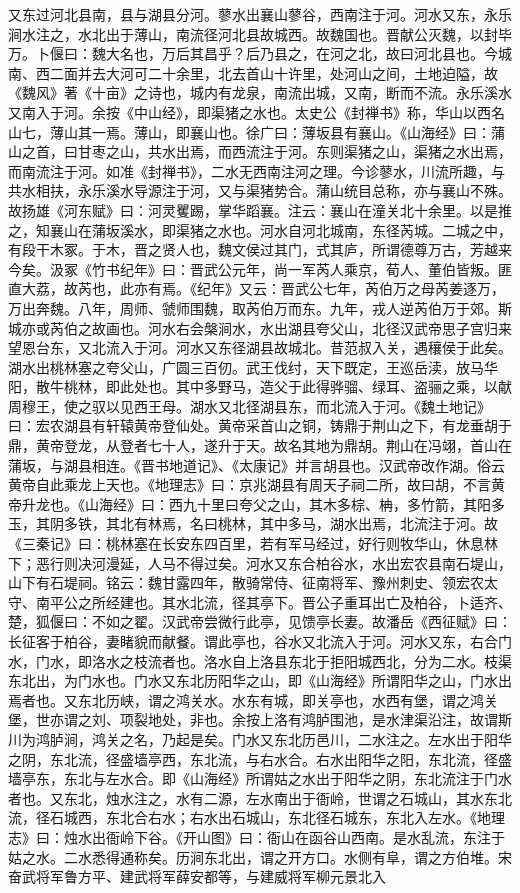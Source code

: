 \documentclass[12pt,UTF8]{ctexbook}
\begin{document}
又东过河北县南，县与湖县分河。蓼水出襄山蓼谷，西南注于河。河水又东，永乐涧水注之，水北出于薄山，南流径河北县故城西。故魏国也。晋献公灭魏，以封毕万。卜偃曰：魏大名也，万后其昌乎？后乃县之，在河之北，故曰河北县也。今城南、西二面并去大河可二十余里，北去首山十许里，处河山之间，土地迫隘，故《魏风》著《十亩》之诗也，城内有龙泉，南流出城，又南，断而不流。永乐溪水又南入于河。余按《中山经》，即渠猪之水也。太史公《封禅书》称，华山以西名山七，薄山其一焉。薄山，即襄山也。徐广曰：薄坂县有襄山。《山海经》曰：蒲山之首，曰甘枣之山，共水出焉，而西流注于河。东则渠猪之山，渠猪之水出焉，而南流注于河。如准《封禅书》，二水无西南注河之理。今诊蓼水，川流所趣，与共水相扶，永乐溪水导源注于河，又与渠猪势合。蒲山统目总称，亦与襄山不殊。故扬雄《河东赋》曰：河灵矍踢，掌华蹈襄。注云：襄山在潼关北十余里。以是推之，知襄山在蒲坂溪水，即渠猪之水也。河水自河北城南，东径芮城。二城之中，有段干木冢。于木，晋之贤人也，魏文侯过其门，式其庐，所谓德尊万古，芳越来今矣。汲冢《竹书纪年》曰：晋武公元年，尚一军芮人乘京，荀人、董伯皆叛。匪直大荔，故芮也，此亦有焉。《纪年》又云：晋武公七年，芮伯万之母芮姜逐万，万出奔魏。八年，周师、虢师围魏，取芮伯万而东。九年，戎人逆芮伯万于郊。斯城亦或芮伯之故画也。河水右会槃涧水，水出湖县夸父山，北径汉武帝思子宫归来望恩台东，又北流入于河。河水又东径湖县故城北。昔范叔入关，遇穰侯于此矣。湖水出桃林塞之夸父山，广圆三百仞。武王伐纣，天下既定，王巡岳渎，放马华阳，散牛桃林，即此处也。其中多野马，造父于此得骅骝、绿耳、盗骊之乘，以献周穆王，使之驭以见西王母。湖水又北径湖县东，而北流入于河。《魏土地记》曰：宏农湖县有轩辕黄帝登仙处。黄帝采首山之铜，铸鼎于荆山之下，有龙垂胡于鼎，黄帝登龙，从登者七十人，遂升于天。故名其地为鼎胡。荆山在冯翊，首山在蒲坂，与湖县相连。《晋书地道记》、《太康记》并言胡县也。汉武帝改作湖。俗云黄帝自此乘龙上天也。《地理志》曰：京兆湖县有周天子祠二所，故曰胡，不言黄帝升龙也。《山海经》曰：西九十里曰夸父之山，其木多棕、柟，多竹箭，其阳多玉，其阴多铁，其北有林焉，名曰桃林，其中多马，湖水出焉，北流注于河。故《三秦记》曰：桃林塞在长安东四百里，若有军马经过，好行则牧华山，休息林下；恶行则决河漫延，人马不得过矣。河水又东合柏谷水，水出宏农县南石堤山，山下有石堤祠。铭云：魏甘露四年，散骑常侍、征南将军、豫州刺史、领宏农太守、南平公之所经建也。其水北流，径其亭下。晋公子重耳出亡及柏谷，卜适齐、楚，狐偃曰：不如之翟。汉武帝尝微行此亭，见馈亭长妻。故潘岳《西征赋》曰：长征客于柏谷，妻睹貌而献餐。谓此亭也，谷水又北流入于河。河水又东，右合门水，门水，即洛水之枝流者也。洛水自上洛县东北于拒阳城西北，分为二水。枝渠东北出，为门水也。门水又东北历阳华之山，即《山海经》所谓阳华之山，门水出焉者也。又东北历峡，谓之鸿关水。水东有城，即关亭也，水西有堡，谓之鸿关堡，世亦谓之刘、项裂地处，非也。余按上洛有鸿胪围池，是水津渠沿注，故谓斯川为鸿胪涧，鸿关之名，乃起是矣。门水又东北历邑川，二水注之。左水出于阳华之阴，东北流，径盛墙亭西，东北流，与右水合。右水出阳华之阳，东北流，径盛墙亭东，东北与左水合。即《山海经》所谓姑之水出于阳华之阴，东北流注于门水者也。又东北，烛水注之，水有二源，左水南出于衙岭，世谓之石城山，其水东北流，径石城西，东北合右水；右水出石城山，东北径石城东，东北入左水。《地理志》曰：烛水出衙岭下谷。《开山图》曰：衙山在函谷山西南。是水乱流，东注于姑之水。二水悉得通称矣。历涧东北出，谓之开方口。水侧有阜，谓之方伯堆。宋奋武将军鲁方平、建武将军薛安都等，与建威将军柳元景北入
\end{document}
